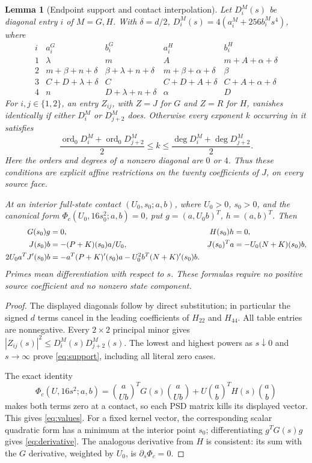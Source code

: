 \documentclass[11pt]{article}
\newtheorem{lemma}{Lemma}
\begin{document}
\begin{lemma}[Endpoint support and contact interpolation]\label{lem:necessary}
Let $D_i^M(s)$ be diagonal entry $i$ of $M=G,H$. With $\delta=d/2$,
$D_i^M(s)=4(a_i^M+256b_i^Ms^4)$, where
\[
\begin{array}{c|cc|cc}
 i&a_i^G&b_i^G&a_i^H&b_i^H\\\hline
 1&\lambda&m&A&m+A+\alpha+\delta\\
 2&m+\beta+n+\delta&\beta+\lambda+n+\delta
   &m+\beta+\alpha+\delta&\beta\\
 3&C+D+\lambda+\delta&C&C+D+A+\delta&C+A+\alpha+\delta\\
 4&n&D+\lambda+n+\delta&\alpha&D
\end{array}
\]
For $i,j\in\{1,2\}$, an entry $Z_{ij}$, with $Z=J$ for $G$ and
$Z=R$ for $H$, vanishes identically if either $D_i^M$ or $D_{j+2}^M$
does. Otherwise every exponent $k$ occurring in it satisfies
\begin{equation}
 \frac{\operatorname{ord}_0D_i^M+\operatorname{ord}_0D_{j+2}^M}{2}
 \le k\le
 \frac{\deg D_i^M+\deg D_{j+2}^M}{2}.                \label{eq:support}
\end{equation}
Here the orders and degrees of a nonzero diagonal are $0$ or $4$.
Thus these conditions are explicit affine restrictions on the twenty
coefficients of $J$, on every source face.

At an interior full-state contact $(U_0,s_0;a,b)$, where $U_0>0$,
$s_0>0$, and the canonical form $\Phi_c(U_0,16s_0^2;a,b)=0$, put
$g=(a,U_0b)^T$, $h=(a,b)^T$. Then
\begin{align}
 G(s_0)g&=0,& H(s_0)h&=0,\notag\\
 J(s_0)b&=-(P+K)(s_0)a/U_0,&
 J(s_0)^Ta&=-U_0(N+K)(s_0)b,                       \label{eq:values}\\
 2U_0a^TJ'(s_0)b
 &=-a^T(P+K)'(s_0)a-U_0^2b^T(N+K)'(s_0)b.         \label{eq:derivative}
\end{align}
Primes mean differentiation with respect to $s$. These formulas require
no positive source coefficient and no nonzero state component.
\end{lemma}
\begin{proof}
The displayed diagonals follow by direct substitution; in particular
the signed $d$ terms cancel in the leading coefficients of $H_{22}$
and $H_{44}$. All table entries are nonnegative.
Every $2\times2$ principal minor gives
$|Z_{ij}(s)|^2\le D_i^M(s)D_{j+2}^M(s)$.
The lowest and highest powers as $s\downarrow0$ and $s\to\infty$
prove \eqref{eq:support}, including all literal zero cases.

The exact identity
\[
 \Phi_c(U,16s^2;a,b)=
 \binom a{Ub}^{\!T}G(s)\binom a{Ub}
 +U\binom ab^{\!T}H(s)\binom ab
\]
makes both terms zero at a contact, so each PSD matrix kills its
displayed vector. This gives \eqref{eq:values}.
For a fixed kernel vector, the corresponding scalar quadratic form
has a minimum at the interior point $s_0$; differentiating $g^TG(s)g$
gives \eqref{eq:derivative}.
The analogous derivative from $H$ is consistent: its sum with the
$G$ derivative, weighted by $U_0$, is $\partial_s\Phi_c=0$.
\end{proof}
\end{document}
